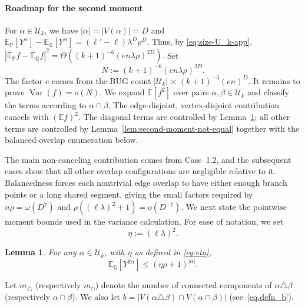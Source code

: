 \documentclass[11pt, letterpaper]{article}
\newtheorem{lemma}[theorem]{Lemma}
\numberwithin{equation}{section}
\newcommand{\E}{\mathbb{E}}
\newcommand{\PP}{\mathbb{P}}
\newcommand{\QQ}{\mathbb{Q}}
\begin{document}
\paragraph*{Roadmap for the second moment}
For $\alpha\in\mathcal U_k$, we have $|\alpha|=|V(\alpha)|=D$ and
$
\E_{\PP}[Y^\alpha]-\E_{\QQ}[Y^\alpha]
=(\ell'-\ell)\lambda^D\rho^D.$
Thus, by \eqref{eq:size-U_k-app}, $
|\E_{\PP}f-\E_{\QQ}f|^2
=\Theta\!\left((k+1)^{-6}(en\lambda\rho)^{2D}\right).$
Set
\begin{equation}\label{eq:N_UB}
    N:=(k+1)^{-6}(en\lambda\rho)^{2D}.
\end{equation}
The factor $e$ comes from the BUG count
$|\mathcal U_k|\asymp (k+1)^{-3}(en)^D$. It remains to prove $\operatorname{Var}(f)=o(N)$. We expand $\E[f^2]$ over pairs $\alpha,\beta\in\mathcal U_k$ and classify the terms according to $\alpha\cap\beta$. The edge-disjoint, vertex-disjoint contribution cancels with $(\E f)^2$. The diagonal terms are controlled by Lemma~\ref{lem:second-moment-equal}; all other terms are controlled by Lemma~\ref{lem:second-moment-not-equal} together with the balanced-overlap enumeration below. 

The main non-canceling contribution comes from Case~1.2, and the subsequent cases show that all other overlap configurations are negligible relative to it. Balancedness forces each nontrivial edge overlap to have either enough branch points or a long shared segment, giving the small factors required by $n\rho=\omega(D^7)$ and $\rho((\ell\lambda)^2+1)=o(D^{-7})$. We next state the pointwise moment bounds used in the variance calculation. For ease of notation, we set \begin{equation}\label{eq:eta}
    \eta:=(\ell\lambda)^2.
\end{equation}
\vspace{-2em}
\begin{lemma}\label{lem:second-moment-equal}
For any $\alpha\in\mathcal{U}_k$, with $\eta$ as defined in \eqref{eq:eta},
\[
\E_\QQ \left[Y^{2\alpha}\right] \le (\eta\rho+1)^{|\alpha|}.
\]
\end{lemma}

Let $m_\triangle$ (respectively $m_\cap$) denote the number of connected components of $\alpha \triangle \beta$  (respectively $\alpha \cap \beta$). We also let $b=|V(\alpha \triangle \beta) \cap V(\alpha \cap \beta)|$ (see~\eqref{eq.defn_b}).
\end{document}
